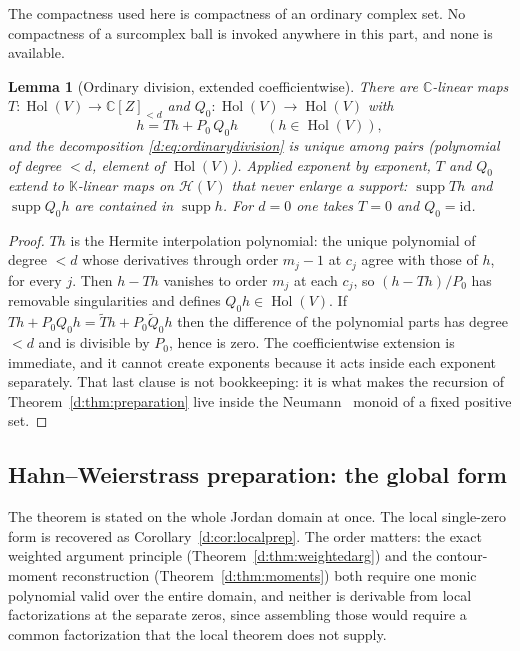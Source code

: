 \documentclass[11pt,a4paper]{article}
\numberwithin{equation}{section}
\newtheorem{lemma}[theorem]{Lemma}
\theoremstyle{definition}
\theoremstyle{remark}
\theoremstyle{plain}
\newcommand{\K}{\mathbb K}
\newcommand{\CC}{\mathbb C}
\DeclareMathOperator{\Hol}{Hol}
\DeclareMathOperator{\supp}{supp}
\newcommand{\Hc}{\mathcal H}
\begin{document}
The compactness used here is compactness of an ordinary complex set.
No compactness of a surcomplex ball is invoked anywhere in this part,
and none is available.

\begin{lemma}[Ordinary division, extended coefficientwise]
\label{d:lem:ordinarydivision}
There are $\CC$-linear maps
$T\colon\Hol(V)\to\CC[Z]_{<d}$ and $Q_0\colon\Hol(V)\to\Hol(V)$ with
\begin{equation}\label{d:eq:ordinarydivision}
 h=T h+P_0\,Q_0h\qquad(h\in\Hol(V)),
\end{equation}
and the decomposition \eqref{d:eq:ordinarydivision} is unique among
pairs (polynomial of degree $<d$, element of $\Hol(V)$).  Applied
exponent by exponent, $T$ and $Q_0$ extend to $\K$-linear maps on
$\Hc(V)$ that \emph{never enlarge a support}: $\supp Th$ and
$\supp Q_0h$ are contained in $\supp h$.  For $d=0$ one takes $T=0$ and
$Q_0=\mathrm{id}$.
\end{lemma}

\begin{proof}
$Th$ is the Hermite interpolation polynomial: the unique polynomial of
degree $<d$ whose derivatives through order $m_j-1$ at $c_j$ agree with
those of $h$, for every $j$.  Then $h-Th$ vanishes to order $m_j$ at
each $c_j$, so $(h-Th)/P_0$ has removable singularities and defines
$Q_0h\in\Hol(V)$.  If $Th+P_0Q_0h=\widetilde T h+P_0\widetilde Q_0h$
then the difference of the polynomial parts has degree $<d$ and is
divisible by $P_0$, hence is zero.  The coefficientwise extension is
immediate, and it cannot create exponents because it acts inside each
exponent separately.  That last clause is not bookkeeping: it is what
makes the recursion of Theorem~\ref{d:thm:preparation} live inside the
Neumann~\cite{Neumann} monoid of a fixed positive set.
\end{proof}

\subsection{Hahn--Weierstrass preparation: the global form}
\label{d:sub:preparation}

The theorem is stated on the whole Jordan domain at once.  The local
single-zero form is recovered as Corollary~\ref{d:cor:localprep}.  The
order matters: the exact weighted argument principle
(Theorem~\ref{d:thm:weightedarg}) and the contour-moment reconstruction
(Theorem~\ref{d:thm:moments}) both require one monic polynomial valid
over the entire domain, and neither is derivable from local
factorizations at the separate zeros, since assembling those would
require a common factorization that the local theorem does not supply.
\end{document}
